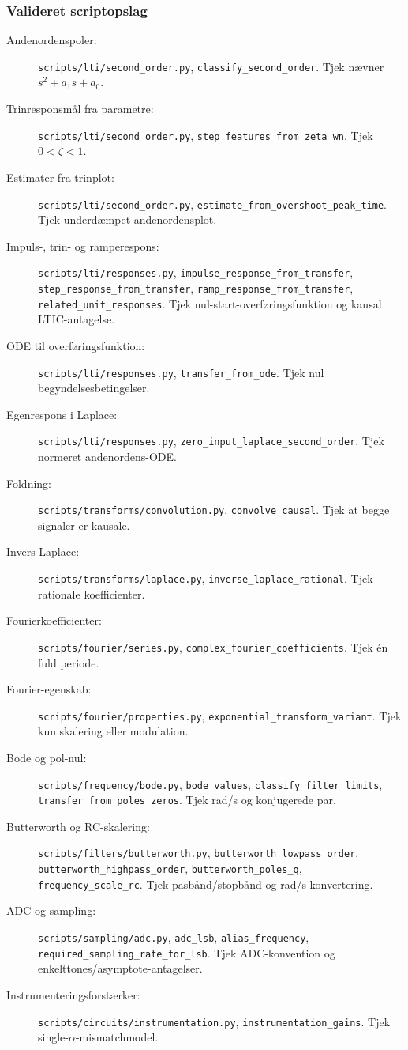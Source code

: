 \subsubsection{Valideret scriptopslag}
\begin{description}
    \item[Andenordenspoler:] \texttt{scripts/lti/second\_order.py}, \texttt{classify\_second\_order}. Tjek nævner \(s^2+a_1s+a_0\).
    \item[Trinresponsmål fra parametre:] \texttt{scripts/lti/second\_order.py}, \texttt{step\_features\_from\_zeta\_wn}. Tjek \(0<\zeta<1\).
    \item[Estimater fra trinplot:] \texttt{scripts/lti/second\_order.py}, \texttt{estimate\_from\_overshoot\_peak\_time}. Tjek underdæmpet andenordensplot.
    \item[Impuls-, trin- og ramperespons:] \texttt{scripts/lti/responses.py}, \texttt{impulse\_response\_from\_transfer}, \texttt{step\_response\_from\_transfer}, \texttt{ramp\_response\_from\_transfer}, \texttt{related\_unit\_responses}. Tjek nul-start-overføringsfunktion og kausal LTIC-antagelse.
    \item[ODE til overføringsfunktion:] \texttt{scripts/lti/responses.py}, \texttt{transfer\_from\_ode}. Tjek nul begyndelsesbetingelser.
    \item[Egenrespons i Laplace:] \texttt{scripts/lti/responses.py}, \texttt{zero\_input\_laplace\_second\_order}. Tjek normeret andenordens-ODE.
    \item[Foldning:] \texttt{scripts/transforms/convolution.py}, \texttt{convolve\_causal}. Tjek at begge signaler er kausale.
    \item[Invers Laplace:] \texttt{scripts/transforms/laplace.py}, \texttt{inverse\_laplace\_rational}. Tjek rationale koefficienter.
    \item[Fourierkoefficienter:] \texttt{scripts/fourier/series.py}, \texttt{complex\_fourier\_coefficients}. Tjek én fuld periode.
    \item[Fourier-egenskab:] \texttt{scripts/fourier/properties.py}, \texttt{exponential\_transform\_variant}. Tjek kun skalering eller modulation.
    \item[Bode og pol-nul:] \texttt{scripts/frequency/bode.py}, \texttt{bode\_values}, \texttt{classify\_filter\_limits}, \texttt{transfer\_from\_poles\_zeros}. Tjek rad/s og konjugerede par.
    \item[Butterworth og RC-skalering:] \texttt{scripts/filters/butterworth.py}, \texttt{butterworth\_lowpass\_order}, \texttt{butterworth\_highpass\_order}, \texttt{butterworth\_poles\_q}, \texttt{frequency\_scale\_rc}. Tjek pasbånd/stopbånd og rad/s-konvertering.
    \item[ADC og sampling:] \texttt{scripts/sampling/adc.py}, \texttt{adc\_lsb}, \texttt{alias\_frequency}, \texttt{required\_sampling\_rate\_for\_lsb}. Tjek ADC-konvention og enkelttones/asymptote-antagelser.
    \item[Instrumenteringsforstærker:] \texttt{scripts/circuits/instrumentation.py}, \texttt{instrumentation\_gains}. Tjek single-\(\alpha\)-mismatchmodel.
\end{description}
